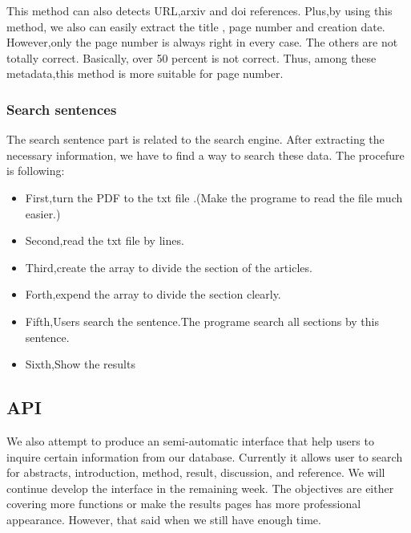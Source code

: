 This method can also detects URL,arxiv and doi references.  
Plus,by using this method, we  also can easily extract the title , page number and creation date. 
However,only the page number is always right in every case. 
The others are not totally correct. 
Basically, over 50 percent is not correct.
Thus, among these metadata,this method is more suitable for page number. 

\subsubsection{Search sentences}

The search sentence part is related to the search engine.
 After extracting the necessary information, we have to find a way to search these data.
 The procefure is following:
\begin{itemize}
	
	\item First,turn the PDF to the txt file .(Make the programe  to read the file much easier.)
	\item Second,read the txt file by lines.
	\item Third,create the array to divide the section of the articles.
	\item Forth,expend the array to divide the section clearly.
	\item Fifth,Users search the sentence.The programe search all sections by this sentence.
	\item Sixth,Show the results
	
\end{itemize}
\subsection{API}
We also attempt to produce an semi-automatic interface that help users to inquire certain information from our database. 
Currently it allows user to search for abstracts, introduction, method, result, discussion, and reference. We will continue develop the interface in the remaining week. 
The objectives are either covering more functions or make the results pages has more professional appearance. However, that
said when we still have enough time.


\newpage %